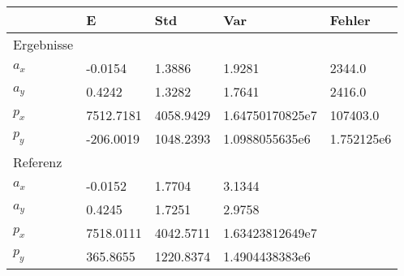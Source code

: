 \begin{tabular}{l|l|l|l|l}

     & E   & Std    & Var    & Fehler \\ 

\hline 

\hline 


Ergebnisse & & & & \\ 

$a_x$  & -0.0154 & 1.3886 & 1.9281 & 2344.0 \\ 

$a_y$  & 0.4242 & 1.3282 & 1.7641 & 2416.0 \\ 

$p_x$  & 7512.7181 & 4058.9429 & 1.64750170825e7 & 107403.0 \\ 

$p_y$  & -206.0019 & 1048.2393 & 1.0988055635e6 & 1.752125e6 \\ 


\hline 

Referenz & & & & \\ 

$a_x$  & -0.0152 & 1.7704 & 3.1344 & \\ 

$a_y$  & 0.4245 & 1.7251 & 2.9758 & \\ 

$p_x$  & 7518.0111 & 4042.5711 & 1.63423812649e7 & \\ 

$p_y$  & 365.8655 & 1220.8374 & 1.4904438383e6 & \\ 

\end{tabular}
